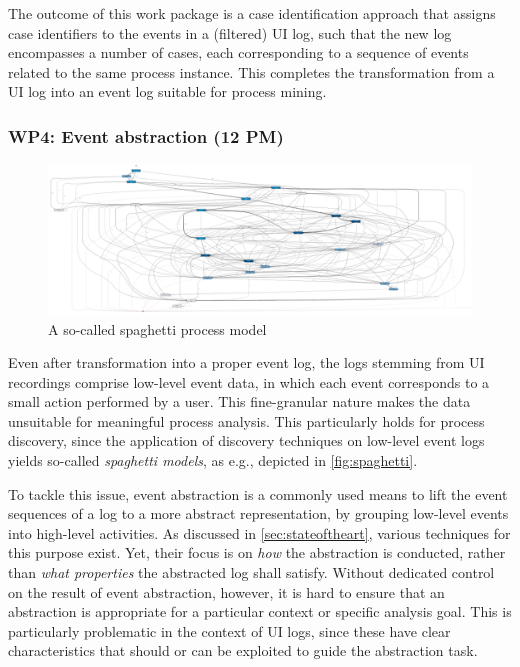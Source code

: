 The outcome of this work package is a case identification approach that assigns case identifiers to the events in a (filtered) UI log, such that the new log encompasses a number of cases, each corresponding to a sequence of events related to the same process instance. This completes the transformation from a UI log into an event log suitable for process mining.


\subsubsection{WP4: Event abstraction (12 PM)}
\label{sec:wp4}

\begin{figure} 
	\vspace{-25pt}
	\begin{center}
		\includegraphics[width=\linewidth]{figures/spaghettiprocess.png}
		\caption{A so-called spaghetti process model}
		\label{fig:spaghetti}
	\end{center}
	\vspace{-15pt}
	\vspace{1pt}
\end{figure} 
Even after transformation into a proper event log, the logs stemming from UI recordings comprise low-level event data, in which each event corresponds to a small action performed by a user. This fine-granular nature makes the data unsuitable for meaningful process analysis. This particularly holds for process discovery, since the application of discovery techniques on low-level event logs yields so-called \emph{spaghetti models}, as e.g., depicted in \autoref{fig:spaghetti}.



To tackle this issue, event abstraction is a commonly used means to lift the event sequences of a log to a more abstract representation, by grouping low-level events into high-level activities. 
As discussed in \autoref{sec:stateoftheart}, various techniques for this purpose exist. Yet, their focus is on \emph{how} the abstraction is conducted, rather than \emph{what properties} the abstracted log shall satisfy. Without dedicated control on the result of event abstraction, however, it is hard to ensure that an abstraction is appropriate for a particular context or specific analysis goal.
This is particularly problematic in the context of UI logs, since these have clear characteristics that should or can be exploited to guide the abstraction task.



